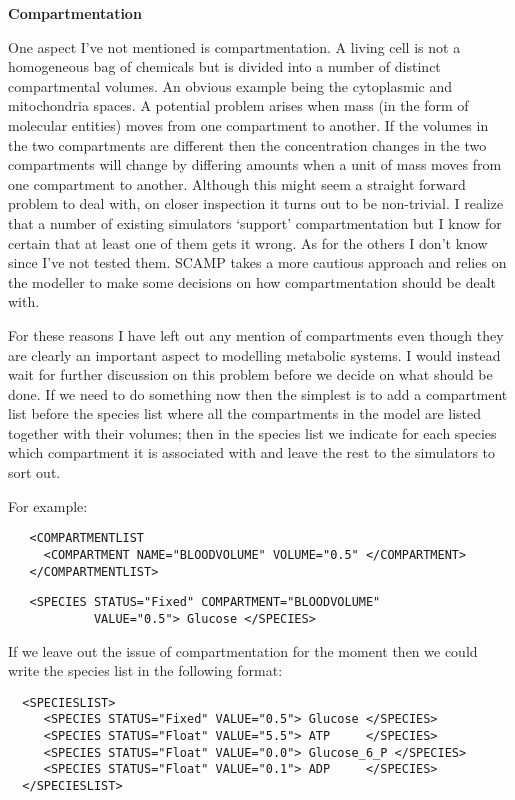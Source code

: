 \documentclass{article}
\begin{document}
{\bf Compartmentation}

One aspect I've not mentioned is compartmentation. A living cell is not a
homogeneous bag of chemicals but is divided into a number of distinct
compartmental volumes. An obvious example being the cytoplasmic and
mitochondria spaces. A potential problem arises when mass (in the form of
molecular entities) moves from one compartment to another. If the volumes in
the two compartments are different then the concentration changes in the two
compartments will change by differing amounts when a unit of mass moves from
one compartment to another. Although this might seem a straight forward
problem to deal with, on closer inspection it turns out to be non-trivial. I
realize that a number of existing simulators `support' compartmentation but I
know for certain that at least one of them gets it wrong. As for the others I
don't know since I've not tested them. SCAMP takes a more cautious approach
and relies on the modeller to make some decisions on how compartmentation
should be dealt with.

For these reasons I have left out any mention of compartments even though they
are clearly an important aspect to modelling metabolic systems. I would instead
wait for further discussion on this problem before we decide on what should be
done. If we need to do something now then the simplest is to add a compartment
list before the species list where all the compartments in the model are
listed together with their volumes; then in the species list we indicate for
each species which compartment it is associated with and leave the rest to the
simulators to sort out.

For example:

{\footnotesize
\begin{verbatim}
   <COMPARTMENTLIST
     <COMPARTMENT NAME="BLOODVOLUME" VOLUME="0.5" </COMPARTMENT>
   </COMPARTMENTLIST>
\end{verbatim} }

{\footnotesize
\begin{verbatim}
   <SPECIES STATUS="Fixed" COMPARTMENT="BLOODVOLUME"
            VALUE="0.5"> Glucose </SPECIES>
\end{verbatim} }


If we leave out the issue of compartmentation for the moment then we could
write the species list in the following format:

{\footnotesize
\begin{verbatim}
  <SPECIESLIST>
     <SPECIES STATUS="Fixed" VALUE="0.5"> Glucose </SPECIES>
     <SPECIES STATUS="Float" VALUE="5.5"> ATP     </SPECIES>
     <SPECIES STATUS="Float" VALUE="0.0"> Glucose_6_P </SPECIES>
     <SPECIES STATUS="Float" VALUE="0.1"> ADP     </SPECIES>
  </SPECIESLIST>
\end{verbatim} }
\end{document}
